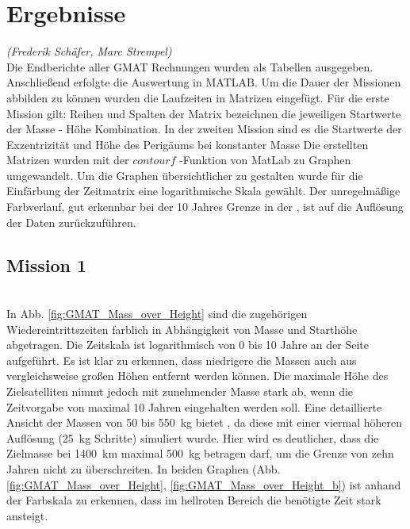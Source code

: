 




\section{Ergebnisse}
\hfill\emph{(Frederik Schäfer, Marc Strempel)}\\
Die Endberichte aller GMAT Rechnungen wurden als Tabellen ausgegeben.  Anschließend erfolgte die Auswertung in MATLAB\textregistered.
Um die Dauer der Missionen abbilden zu können wurden die Laufzeiten in Matrizen eingefügt. 
Für die erste Mission gilt: Reihen und Spalten der Matrix bezeichnen die jeweiligen Startwerte der Masse - Höhe Kombination. In der zweiten Mission sind es die Startwerte der Exzentrizität und Höhe des Perigäums bei konstanter Masse
Die erstellten Matrizen wurden mit der $contourf$ -Funktion von MatLab zu Graphen umgewandelt. Um die Graphen übersichtlicher zu gestalten wurde für die Einfärbung der Zeitmatrix eine logarithmische Skala gewählt. Der unregelmäßige Farbverlauf, gut erkennbar bei der \num{10} Jahres Grenze in der , ist auf die Auflösung der Daten zurückzuführen.\\

\subsection{Mission 1}\\
In Abb. \ref{fig:GMAT_Mass_over_Height} sind die zugehörigen Wiedereintrittszeiten farblich in Abhängigkeit von Masse und Starthöhe abgetragen. Die Zeitskala ist logarithmisch von \num{0} bis \num{10} Jahre an der Seite aufgeführt.  
Es ist klar zu erkennen, dass niedrigere die Massen auch aus vergleichsweise großen Höhen entfernt werden können. Die maximale Höhe des Zielsatelliten nimmt jedoch mit zunehmender Masse stark ab, wenn die Zeitvorgabe von maximal \num{10} Jahren eingehalten werden soll.
Eine detaillierte Ansicht der Massen von \num{50} bis \SI{550}{\kilogram} bietet , da diese mit einer viermal höheren Auflösung (\SI{25}{\kilogram} Schritte) simuliert wurde. Hier wird es deutlicher, dass die Zielmasse bei \SI{1400}{\kilo\metre} maximal \SI{500}{\kilogram} betragen darf, um die Grenze von zehn Jahren nicht zu überschreiten.
In beiden Graphen (Abb. \ref{fig:GMAT_Mass_over_Height}, \ref{fig:GMAT_Mass_over_Height_b}) ist anhand der Farbskala zu erkennen, dass im hellroten Bereich die benötigte Zeit stark ansteigt. 

